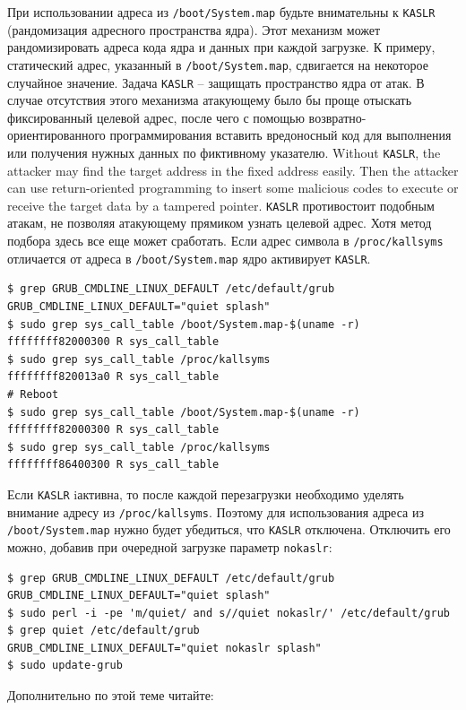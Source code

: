 \documentclass[10pt, oneside]{book}
\begin{document}
При использовании адреса из \verb|/boot/System.map| будьте внимательны к \verb|KASLR| (рандомизация адресного пространства ядра). Этот механизм может рандомизировать адреса кода ядра и данных при каждой загрузке. К примеру, статический адрес, указанный в \verb|/boot/System.map|, сдвигается на некоторое случайное значение.
Задача \verb|KASLR| – защищать пространство ядра от атак. В случае отсутствия этого механизма атакующему было бы проще отыскать фиксированный целевой адрес, после чего с помощью возвратно-ориентированного программирования вставить вредоносный код для выполнения или получения нужных данных по фиктивному указателю.
Without \verb|KASLR|, the attacker may find the target address in the fixed address easily.
Then the attacker can use return-oriented programming to insert some malicious codes to execute or receive the target data by a tampered pointer.
\verb|KASLR| противостоит подобным атакам, не позволяя атакующему прямиком узнать целевой адрес. Хотя метод подбора здесь все еще может сработать. Если адрес символа в \verb|/proc/kallsyms| отличается от адреса в \verb|/boot/System.map| ядро активирует \verb|KASLR|.

\begin{verbatim}
$ grep GRUB_CMDLINE_LINUX_DEFAULT /etc/default/grub
GRUB_CMDLINE_LINUX_DEFAULT="quiet splash"
$ sudo grep sys_call_table /boot/System.map-$(uname -r)
ffffffff82000300 R sys_call_table
$ sudo grep sys_call_table /proc/kallsyms
ffffffff820013a0 R sys_call_table
# Reboot
$ sudo grep sys_call_table /boot/System.map-$(uname -r)
ffffffff82000300 R sys_call_table
$ sudo grep sys_call_table /proc/kallsyms 
ffffffff86400300 R sys_call_table
\end{verbatim}

Если \verb|KASLR| iактивна, то после каждой перезагрузки необходимо уделять внимание адресу из \verb|/proc/kallsyms|.
Поэтому для использования адреса из \verb|/boot/System.map| нужно будет убедиться, что \verb|KASLR| отключена.
Отключить его можно, добавив при очередной загрузке параметр \verb|nokaslr|:

\begin{verbatim}
$ grep GRUB_CMDLINE_LINUX_DEFAULT /etc/default/grub
GRUB_CMDLINE_LINUX_DEFAULT="quiet splash"
$ sudo perl -i -pe 'm/quiet/ and s//quiet nokaslr/' /etc/default/grub
$ grep quiet /etc/default/grub
GRUB_CMDLINE_LINUX_DEFAULT="quiet nokaslr splash"
$ sudo update-grub
\end{verbatim}

Дополнительно по этой теме читайте:
\end{document}
